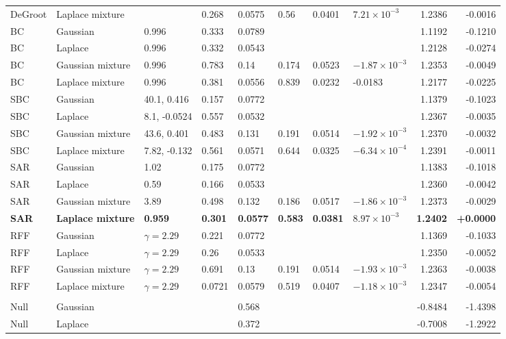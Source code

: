 \begin{longtable}{llllllllrr}
DeGroot & Laplace mixture &  & 0.268 & 0.0575 & 0.56 & 0.0401 & $7.21\times10^{-3}$ & 1.2386 & -0.0016 \\
BC & Gaussian & 0.996 & 0.333 & 0.0789 &  &  &  & 1.1192 & -0.1210 \\
BC & Laplace & 0.996 & 0.332 & 0.0543 &  &  &  & 1.2128 & -0.0274 \\
BC & Gaussian mixture & 0.996 & 0.783 & 0.14 & 0.174 & 0.0523 & $-1.87\times10^{-3}$ & 1.2353 & -0.0049 \\
BC & Laplace mixture & 0.996 & 0.381 & 0.0556 & 0.839 & 0.0232 & -0.0183 & 1.2177 & -0.0225 \\
SBC & Gaussian & 40.1, 0.416 & 0.157 & 0.0772 &  &  &  & 1.1379 & -0.1023 \\
SBC & Laplace & 8.1, -0.0524 & 0.557 & 0.0532 &  &  &  & 1.2367 & -0.0035 \\
SBC & Gaussian mixture & 43.6, 0.401 & 0.483 & 0.131 & 0.191 & 0.0514 & $-1.92\times10^{-3}$ & 1.2370 & -0.0032 \\
SBC & Laplace mixture & 7.82, -0.132 & 0.561 & 0.0571 & 0.644 & 0.0325 & $-6.34\times10^{-4}$ & 1.2391 & -0.0011 \\
SAR & Gaussian & 1.02 & 0.175 & 0.0772 &  &  &  & 1.1383 & -0.1018 \\
SAR & Laplace & 0.59 & 0.166 & 0.0533 &  &  &  & 1.2360 & -0.0042 \\
SAR & Gaussian mixture & 3.89 & 0.498 & 0.132 & 0.186 & 0.0517 & $-1.86\times10^{-3}$ & 1.2373 & -0.0029 \\
\textbf{SAR} & \textbf{Laplace mixture} & \textbf{0.959} & \textbf{0.301} & \textbf{0.0577} & \textbf{0.583} & \textbf{0.0381} & \textbf{$8.97\times10^{-3}$} & \textbf{1.2402} & \textbf{+0.0000} \\
RFF & Gaussian & $\gamma=2.29$ & 0.221 & 0.0772 &  &  &  & 1.1369 & -0.1033 \\
RFF & Laplace & $\gamma=2.29$ & 0.26 & 0.0533 &  &  &  & 1.2350 & -0.0052 \\
RFF & Gaussian mixture & $\gamma=2.29$ & 0.691 & 0.13 & 0.191 & 0.0514 & $-1.93\times10^{-3}$ & 1.2363 & -0.0038 \\
RFF & Laplace mixture & $\gamma=2.29$ & 0.0721 & 0.0579 & 0.519 & 0.0407 & $-1.18\times10^{-3}$ & 1.2347 & -0.0054 \\
\midrule
\multicolumn{10}{l}{\cmv{}} \\
Null & Gaussian &  &  & 0.568 &  &  &  & -0.8484 & -1.4398 \\
Null & Laplace &  &  & 0.372 &  &  &  & -0.7008 & -1.2922 \\

\end{longtable}

